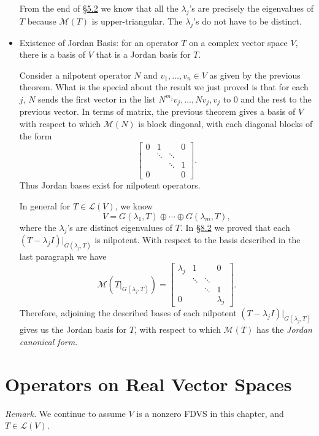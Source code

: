 \documentclass[11pt]{article}
\newcommand{\lk}[2]{\hyperlink{subsection.#1.#2}{\S#1.#2}}
\newcommand{\df}[1]{\textit{\textsf{#1}}}
\newcommand{\LV}{\mathcal{L}(V)}
\newcommand{\M}{\mathcal{M}}
\begin{document}
\begin{itemize}
    From the end of \lk{5}{2} we know that all the $\lambda_j$'s are precisely the eigenvalues of $T$ because $\M(T)$ is upper-triangular. The $\lambda_j$'s do not have to be distinct.
    \item Existence of Jordan Basis: for an operator $T$ on a complex vector space $V$, there is a basis of $V$ that is a Jordan basis for $T$.

    Consider a nilpotent operator $N$ and $v_1,\dots,v_n \in V$ as given by the previous theorem. What is the special about the result we just proved is that for each $j$, $N$ sends the first vector in the list $N^{m_j}v_j,\dots,Nv_j,v_j$ to 0 and the rest to the previous vector. In terms of matrix, the previous theorem gives a basis of $V$ with respect to which $\M(N)$ is block diagonal, with each diagonal blocks of the form \[\begin{bmatrix}
        0 & 1 & & 0 \\
        & \ddots & \ddots & \\
        & & \ddots & 1 \\
        0 & & & 0
    \end{bmatrix}.\] Thus Jordan bases exist for nilpotent operators.
    
    In general for $T \in \LV$, we know \[V = G(\lambda_1,T) \oplus \cdots \oplus G(\lambda_m,T),\] where the $\lambda_j$'s are distinct eigenvalues of $T$. In \lk{8}{2} we proved that each $(T-\lambda_j I)|_{G(\lambda_j,T)}$ is nilpotent. With respect to the basis described in the last paragraph we have \[\M(T|_{G(\lambda_j,T)}) = \begin{bmatrix}
        \lambda_j & 1 & & 0 \\
        & \ddots & \ddots & \\
        & & \ddots & 1 \\
        0 & & & \lambda_j
    \end{bmatrix}.\] Therefore, adjoining the described bases of each nilpotent $(T-\lambda_j I)|_{G(\lambda_j,T)}$ gives us the Jordan basis for $T$, with respect to which $\M(T)$ has the \df{Jordan canonical form}.
\end{itemize}


\newpage
\section{Operators on Real Vector Spaces}
\textit{Remark.} We continue to assume $V$ is a nonzero FDVS in this chapter, and $T \in \LV$.
\end{document}
